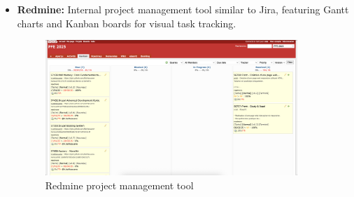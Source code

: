 \begin{itemize}
    \item \textbf{Redmine:} Internal project management tool similar to Jira, featuring Gantt charts and Kanban boards for visual task tracking. 
    \begin{figure}[H]
        \centering
        \includegraphics[width=0.9\textwidth]{images/redmine.png}
        \caption{Redmine project management tool}
    \end{figure}


\end{itemize}
